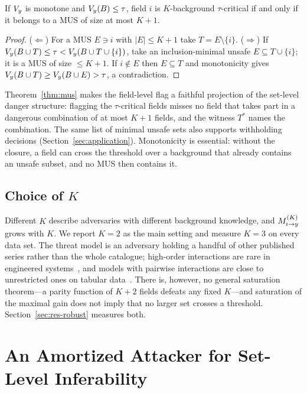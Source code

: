 \begin{theorem}\label{thm:mus}
If $V_{y}$ is monotone and $V_{y}(B)\le\tau$, field $i$ is $K$-background $\tau$-critical if and
only if it belongs to a MUS of size at most $K+1$.
\end{theorem}
\begin{proof}
($\Leftarrow$) For a MUS $E\ni i$ with $|E|\le K+1$ take $T=E\setminus\{i\}$.
($\Rightarrow$) If $V_{y}(B\cup T)\le\tau<V_{y}(B\cup T\cup\{i\})$, take an inclusion-minimal unsafe
$E\subseteq T\cup\{i\}$; it is a MUS of size $\le K+1$. If $i\notin E$ then $E\subseteq T$ and
monotonicity gives $V_{y}(B\cup T)\ge V_{y}(B\cup E)>\tau$, a contradiction.
\end{proof}
Theorem~\ref{thm:mus} makes the field-level flag a faithful projection of the set-level
danger structure: flagging the $\tau$-critical fields misses no field that takes part in a
dangerous combination of at most $K+1$ fields, and the witness $T^*$ names the combination.
The same list of minimal unsafe sets also supports withholding decisions
(Section~\ref{sec:application}).
Monotonicity is essential: without the closure, a field can cross the threshold over a
background that already contains an unsafe subset, and no MUS then contains it.


\subsection{Choice of $K$}
Different $K$ describe adversaries with different background knowledge, and $M^{(K)}_{i \to y}$ grows with $K$.
We report $K=2$ as the main setting and measure $K=3$ on every data set. The threat model is an
adversary holding a handful of other published series rather than the whole catalogue;
high-order interactions are rare in engineered systems~\cite{li2006regularities}, and models with
pairwise interactions are close to unrestricted ones on tabular data~\cite{lou2013ga2m}. There is,
however, no general saturation theorem---a parity function of $K+2$ fields defeats any fixed
$K$---and saturation of the maximal gain does not imply that no larger set crosses a threshold.
Section~\ref{sec:res-robust} measures both.

\section{An Amortized Attacker for Set-Level Inferability}\label{sec:model}

